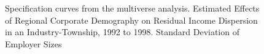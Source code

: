 \documentclass{article}
\begin{document}
\begin{figure}[htbp]
  \centering
  \caption{Specification curves from the multiverse analysis. Estimated Effects of Regional Corporate Demography on Residual Income Dispersion in an Industry-Township, 1992 to 1998.  Standard Deviation of Employer Sizes}
  \label{fig:gross_income}
  
\end{figure}

\clearpage %
\end{document}
